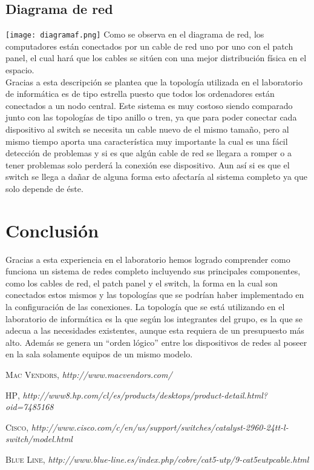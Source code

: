 \documentclass{udpreport}
\begin{document}
	\section{Diagrama de red}
		\texttt{[image: diagramaf.png]}
		Como se observa en el diagrama de red, los computadores están conectados por un cable de red uno por uno con el patch                 panel, el cual hará que los cables se sitúen con una mejor distribución física en el espacio.\\
                Gracias a esta descripción se plantea que la topología utilizada en el laboratorio de informática es de tipo estrella                 puesto que todos los ordenadores están conectados a un nodo central. Este sistema es muy costoso siendo comparado                     junto con las topologías de tipo anillo o tren, ya que para poder conectar cada dispositivo al switch se necesita un                  cable nuevo de el mismo tamaño, pero al mismo tiempo aporta una característica muy importante la cual es una fácil                    detección de problemas y si es que algún cable de red se llegara a romper o a tener problemas solo perderá la conexión                 ese dispositivo. Aun así si es que el switch se llega a dañar de alguna forma esto afectaría al sistema completo ya                   que solo depende de éste.

\chapter{Conclusión}
                Gracias a esta experiencia en el laboratorio hemos logrado comprender como funciona un sistema de redes completo 
                incluyendo sus principales componentes, como los cables de red, el patch panel y el switch, la forma en la cual son 
                conectados estos mismos y las topologías que se podrían haber implementado en la configuración de las conexiones. La 
                topología que se está utilizando en el laboratorio de informática es la que según los integrantes del grupo, es la que
                se adecua a las necesidades existentes, aunque esta requiera de un presupuesto más alto. Además se genera un ``orden lógico'' entre los dispositivos de redes al poseer en la sala solamente equipos de un mismo modelo.
\begin{thebibliography}{x}

 \textsc{Mac Vendors},
\textit{http://www.macvendors.com/}

 \textsc{HP},
\textit{http://www8.hp.com/cl/es/products/desktops/product-detail.html?oid=7485168}

 \textsc{Cisco},
\textit{http://www.cisco.com/c/en/us/support/switches/catalyst-2960-24tt-l-switch/model.html}

 \textsc{Blue Line},
\textit{http://www.blue-line.es/index.php/cobre/cat5-utp/9-cat5eutpcable.html}

\end{thebibliography}
\end{document}
